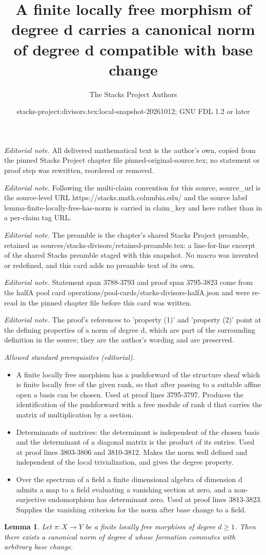 \documentclass[10pt,a4paper]{amsart}
\title{A finite locally free morphism of degree d carries a canonical norm of degree d compatible with base change}
\author{The Stacks Project Authors}
\date{stacks-project:divisors.tex:local-snapshot-20261012; GNU FDL 1.2 or later}
\theoremstyle{plain}
\newtheorem{lemma}[subsection]{Lemma}
\theoremstyle{definition}
\theoremstyle{remark}
\numberwithin{equation}{subsection}
\begin{document}
\maketitle
\noindent\textit{Editorial note.} All delivered mathematical text is the author's own, copied from the pinned Stacks Project chapter file pinned-original-source.tex; no statement or proof step was rewritten, reordered or removed.\par\medskip
\noindent\textit{Editorial note.} Following the multi-claim convention for this source, source\_url is the source-level URL https://stacks.math.columbia.edu/ and the source label lemma-finite-locally-free-has-norm is carried in claim\_key and here rather than in a per-claim tag URL.\par\medskip
\noindent\textit{Editorial note.} The preamble is the chapter's shared Stacks Project preamble, retained as sources/stacks-divisors/retained-preamble.tex: a line-for-line excerpt of the shared Stacks preamble staged with this snapshot. No macro was invented or redefined, and this card adds no preamble text of its own.\par\medskip
\noindent\textit{Editorial note.} Statement span 3788-3793 and proof span 3795-3823 come from the halfA pool card operations/pool-cards/stacks-divisors-halfA.json and were re-read in the pinned chapter file before this card was written.\par\medskip
\noindent\textit{Editorial note.} The proof's references to 'property (1)' and 'property (2)' point at the defining properties of a norm of degree d, which are part of the surrounding definition in the source; they are the author's wording and are preserved.\par\medskip
\noindent\textit{Allowed standard prerequisites (editorial).}\begin{itemize}
\item A finite locally free morphism has a pushforward of the structure sheaf which is finite locally free of the given rank, so that after passing to a suitable affine open a basis can be chosen. Used at proof lines 3795-3797. Produces the identification of the pushforward with a free module of rank d that carries the matrix of multiplication by a section.
\item Determinants of matrices: the determinant is independent of the chosen basis and the determinant of a diagonal matrix is the product of its entries. Used at proof lines 3803-3806 and 3810-3812. Makes the norm well defined and independent of the local trivialization, and gives the degree property.
\item Over the spectrum of a field a finite dimensional algebra of dimension d admits a map to a field evaluating a vanishing section at zero, and a non-surjective endomorphism has determinant zero. Used at proof lines 3813-3823. Supplies the vanishing criterion for the norm after base change to a field.
\end{itemize}\medskip
\begin{lemma}
\label{lemma-finite-locally-free-has-norm}
Let $\pi : X \to Y$ be a finite locally free morphism of degree $d \geq 1$.
Then there exists a canonical norm of degree $d$ whose formation commutes
with arbitrary base change.
\end{lemma}
\end{document}
